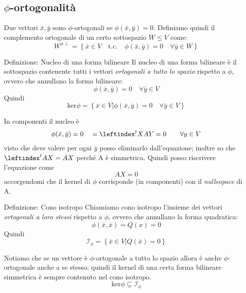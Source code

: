 \documentclass[x11names]{article}
\begin{document}
\subsection{$\phi$-ortogonalità}
Due vettori $\bar{x},\bar{y}$ sono $\phi$-ortogonali se $\phi (\bar{x},\bar{y}) = 0$. Definiamo quindi il complemento ortogonale di un certo sottospazio $W \leq V$ come:
\[
W^{\phi \perp} = \left\{\bar{x} \in V \quad \text{t.c.} \quad \phi(\bar{x},\bar{y}) = 0 \quad \forall \bar{y} \in W \right\}
\]

	\begin{center}
	\colorbox{myblue}{\begin{minipage}{5.75in}
			\begin{blues}{Definizione: Nucleo di una forma bilineare}
			Il nucleo di una forma bilineare è il sottospazio contenente tutti i vettori \textit{ortogonali a tutto lo spazio} rispetto a $\phi$, ovvero che annullano la forma bilineare:
			\[
			\phi(\bar{x},\bar{y}) = 0 \quad \forall \bar{y} \in V
			\]
			Quindi
			\[
			\text{ker}\phi = \left\{\bar{x} \in V | \phi(\bar{x},\bar{y}) = 0 \quad \forall \bar{y} \in V\right\}
			\]
			\end{blues}
	\end{minipage}}       
\end{center}

\noindent
In componenti il nucleo è 
\[
\phi(\bar{x},\bar{y}) = 0 \quad  = \leftindex^{t}{X}AY = 0 \qquad \forall y \in V
\]
visto che deve valere per ogni $\bar{y}$ posso eliminarlo dall'equazione; inoltre so che $\leftindex^{t}{A}X = AX$ perché A è simmetrica. Quindi posso riscrivere l'equazione come
\[
 AX = 0
\]
accorgendomi che il kernel di $\phi$ corrisponde (in componenti) con il \textit{nullsopace} di A.
	\begin{center}
	\colorbox{myblue}{\begin{minipage}{5.75in}
			\begin{blues}{Definizione: Cono isotropo}
				Chiamiamo cono isotropo l'insieme dei vettori \textit{ortogonali a loro stessi} rispetto a $\phi$, ovvero che annullano la forma quadratica:
				\[
				\phi(\bar{x},\bar{x}) = Q(x) = 0
				\]
				Quindi
				\[
				\mathcal{I}_\phi = \left\{\bar{x} \in V | Q(\bar{x}) = 0 \right\}
				\]
			\end{blues}
	\end{minipage}}       
\end{center}
Notiamo che se un vettore è $\phi$-ortogonale a tutto lo spazio allora è anche $\phi$-ortogonale anche a se stesso; quindi il kernel di una certa forma bilineare simmetrica è sempre contenuto nel cono isotropo.
\[
\text{ker}\phi \subseteq \mathcal{I}_{\phi}
\]
\end{document}
